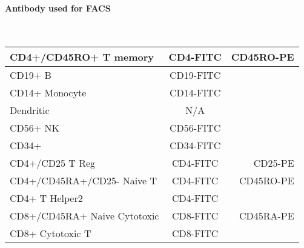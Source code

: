 \documentclass{article}
\begin{document}
\paragraph{Antibody used for FACS} ~\\
\begin{tabular}{ |l| c|r| }
\hline
CD4+/CD45RO+  T memory&CD4-FITC&CD45RO-PE\\ \hline
CD19+ B&CD19-FITC&\\ \hline
CD14+ Monocyte&CD14-FITC&\\ \hline
Dendritic&N/A&\\ \hline
CD56+ NK&CD56-FITC&\\ \hline
CD34+&CD34-FITC&\\ \hline
CD4+/CD25 T Reg&CD4-FITC&CD25-PE\\ \hline
CD4+/CD45RA+/CD25- Naive T&CD4-FITC&CD45RO-PE\\ \hline
CD4+ T Helper2&CD4-FITC&\\ \hline
CD8+/CD45RA+ Naive Cytotoxic&CD8-FITC&CD45RA-PE\\ \hline
CD8+ Cytotoxic T&CD8-FITC&\\ \hline
\end{tabular}
\end{document}
